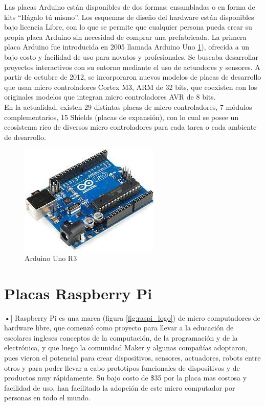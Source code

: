 Las placas Arduino están disponibles de dos formas: ensambladas o en forma de kits ``Hágalo tú mismo''. Los esquemas de diseño del hardware están disponibles bajo licencia Libre, con lo que se permite que cualquier persona pueda crear su propia placa Arduino sin necesidad de comprar una prefabricada. La primera placa Arduino fue introducida en 2005 llamada Arduino Uno \ref{fig:arduinouno}), ofrecida a un bajo costo y facilidad de uso para novatos y profesionales. Se buscaba desarrollar proyectos interactivos con su entorno mediante el uso de actuadores y sensores. A partir de octubre de 2012, se incorporaron nuevos modelos de placas de desarrollo que usan micro controladores Cortex M3, ARM de 32 bits, que coexisten con los originales modelos que integran micro controladores AVR de 8 bits.\\

En la actualidad, existen 29 distintas placas de micro controladores, 7 módulos complementarios, 15 Shields (placas de expansión), con lo cual se posee un ecosistema rico de diversos micro controladores para cada tarea o cada ambiente de desarrollo. 

\begin{figure}[htb]
\centering
\includegraphics[scale=0.7]{./Figuras/arduino_uno.jpeg}
\caption{Arduino Uno R3}
\label{fig:arduinouno}
\vspace*{-10pt}
\end{figure}

\section{Placas Raspberry Pi}
\textbf{•}]
Raspberry Pi es una marca (figura \ref{fig:raspi_logo}) de micro computadores de hardware libre, que comenzó como proyecto para llevar a la educación  de escolares ingleses conceptos de la computación, de la programación y de la electrónica, y que luego la comunidad Maker y algunas compañías adoptaron, pues vieron el potencial para crear dispositivos, sensores, actuadores, robots entre otros y para poder llevar a cabo prototipos funcionales de dispositivos y de productos muy rápidamente. Su bajo costo de \$35 por la placa mas costosa y facilidad de uso, han facilitado la adopción de este micro computador por personas en todo el mundo.\\

